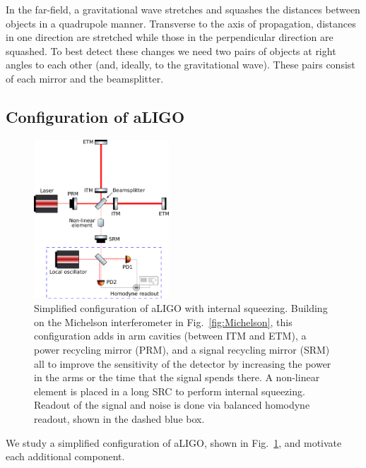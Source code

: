 \documentclass[aps,pra,superscriptaddress,reprint,nofootinbib]{revtex4-1}
\begin{document}
In the far-field, a gravitational wave stretches and squashes the distances between objects in a quadrupole manner. Transverse to the axis of propagation, distances in one direction are stretched while those in the perpendicular direction are squashed. To best detect these changes we need two pairs of objects at right angles to each other (and, ideally, to the gravitational wave). These pairs consist of each mirror and the beamsplitter.


\subsection{Configuration of aLIGO}

\begin{figure}[ht]
	\begin{center}
	\includegraphics[width=0.45\textwidth]{figures/aLIGO_internal_squeezing.pdf}
	\end{center}
	\caption{Simplified configuration of aLIGO with internal squeezing. Building on the Michelson interferometer in Fig.~\ref{fig:Michelson}, this configuration adds in arm cavities (between ITM and ETM), a power recycling mirror (PRM), and a signal recycling mirror (SRM) all to improve the sensitivity of the detector by increasing the power in the arms or the time that the signal spends there. A non-linear element is placed in a long SRC to perform internal squeezing. Readout of the signal and noise is done via balanced homodyne readout, shown in the dashed blue box.}
	\label{fig:aLIGO_configuration}
\end{figure}

We study a simplified configuration of aLIGO, shown in Fig.~\ref{fig:aLIGO_configuration}, and motivate each additional component.
\end{document}
